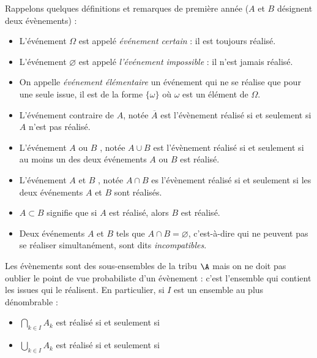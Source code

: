 \documentclass[a4paper,10pt]{report}
\begin{document}
\begin{itemize}
Rappelons quelques définitions et remarques de première année ($A$ et $B$ désignent deux évènements) : 

\medskip

\begin{itemize}
  \item L'événement $\Omega$ est appelé \emph{événement certain} : il est toujours réalisé.
  \item L'événement $\varnothing$ est appelé \emph{l'événement impossible} : il n'est jamais réalisé.
  \item On appelle \emph{événement élémentaire} un événement qui ne se réalise que pour une seule issue, il est de la forme $\{\omega\}$ où $\omega$ est un élément de $\Omega$.
 \item L'événement contraire de $A$, notée $\overline{A}$ est l'évènement réalisé si et seulement si $A$ n'est pas réalisé.
  \item L'événement \og $A$ ou $B$ \fg , notée $A \cup B$ est l'évènement réalisé si et seulement si au moins un des deux événements $A$ ou $B$ est réalisé.
  \item L'événement \og $A$ et $B$ \fg , notée $A \cap B$ es l'évènement réalisé si et seulement si les deux événements $A$ et $B$ sont réalisés.
\item $A \subset B$ signifie que si $A$ est réalisé, alors $B$ est réalisé.
\item Deux événements $A$ et $B$ tels que $A \cap B=\varnothing$, c'est-à-dire qui ne peuvent pas se réaliser simultanément, sont dits \emph{incompatibles}.
\end{itemize}


\medskip

Les évènements sont des sous-ensembles de la tribu $\A$ mais on ne doit pas oublier le point de vue probabiliste d'un évènement : c'est l'ensemble qui contient les issues qui le réalisent. En particulier, si $I$ est un ensemble au plus dénombrable :

\vspace{0.2cm}

\begin{itemize}
  \item $\bigcap\limits_{k\in I} A_k$ est réalisé si et seulement si 
  \item  $\bigcup\limits_{k\in I} A_k$ est réalisé si et seulement si 
\end{itemize}


\end{itemize}
\end{document}

